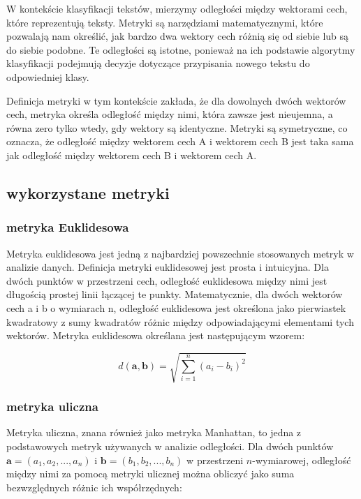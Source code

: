 \documentclass{article}
\begin{document}
W kontekście klasyfikacji tekstów, mierzymy odległości między wektorami cech, które reprezentują teksty. Metryki są narzędziami matematycznymi, które pozwalają nam określić, jak bardzo dwa wektory cech różnią się od siebie lub są do siebie podobne. Te odległości są istotne, ponieważ na ich podstawie algorytmy klasyfikacji podejmują decyzje dotyczące przypisania nowego tekstu do odpowiedniej klasy.\newline

\noindent Definicja metryki w tym kontekście zakłada, że dla dowolnych dwóch wektorów cech, metryka określa odległość między nimi, która zawsze jest nieujemna, a równa zero tylko wtedy, gdy wektory są identyczne. Metryki są symetryczne, co oznacza, że odległość między wektorem cech A i wektorem cech B jest taka sama jak odległość między wektorem cech B i wektorem cech A. \newline

\subsection*{wykorzystane metryki}

\subsubsection*{metryka Euklidesowa}

Metryka euklidesowa jest jedną z najbardziej powszechnie stosowanych metryk w analizie danych. Definicja metryki euklidesowej jest prosta i intuicyjna. Dla dwóch punktów w przestrzeni cech, odległość euklidesowa między nimi jest długością prostej linii łączącej te punkty. Matematycznie, dla dwóch wektorów cech a i b o wymiarach n, odległość euklidesowa jest określona jako pierwiastek kwadratowy z sumy kwadratów różnic między odpowiadającymi elementami tych wektorów. Metryka euklidesowa określana jest następującym wzorem: \newline

\begin{equation}
   d(\mathbf{a}, \mathbf{b}) = \sqrt{\sum_{i=1}^{n} (a_i - b_i)^2}
\end{equation}

\subsubsection*{metryka uliczna}

Metryka uliczna, znana również jako metryka Manhattan, to jedna z podstawowych metryk używanych w analizie odległości. Dla dwóch punktów \\ $\mathbf{a} = (a_1, a_2, ..., a_n)$ i $\mathbf{b} = (b_1, b_2, ..., b_n)$ w przestrzeni $n$-wymiarowej, odległość między nimi za pomocą metryki ulicznej można obliczyć jako suma bezwzględnych różnic ich współrzędnych:
\end{document}
